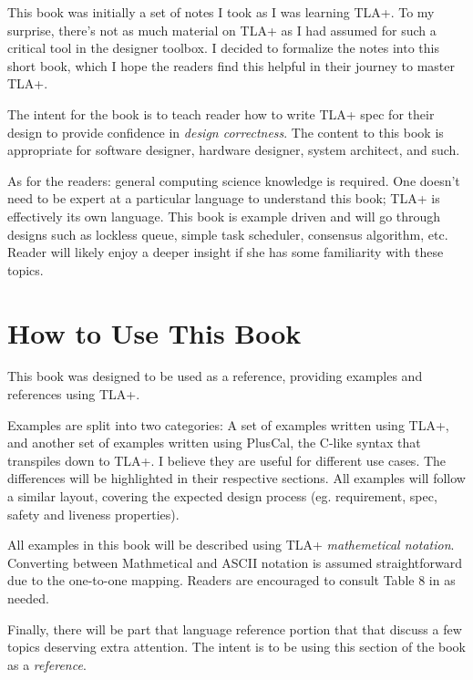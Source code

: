 This book was initially a set of notes I took as I was learning TLA+. To my
surprise, there's not as much material on TLA+ as I had assumed for such a
critical tool in the designer toolbox. I decided to formalize the notes into
this short book, which I hope the readers find this helpful in their journey to
master TLA+.  \newline

The intent for the book is to teach reader how to write TLA+ spec for their
design to provide confidence in \textit{design correctness}. The content to this
book is appropriate for software designer, hardware designer, system architect,
and such.\newline 

As for the readers: general computing science knowledge is required. One doesn't
need to be expert at a particular language to understand this book; TLA+ is
effectively its own language. This book is example driven and will go through
designs such as lockless queue, simple task scheduler, consensus algorithm, etc.
Reader will likely enjoy a deeper insight if she has some familiarity with these
topics.

\section{How to Use This Book}

This book was designed to be used as a reference, providing examples and
references using TLA+.\newline

Examples are split into two categories: A set of examples written using TLA+,
and another set of examples written using PlusCal, the C-like syntax that
transpiles down to TLA+. I believe they are useful for different use cases.  The
differences will be highlighted in their respective sections. All examples will
follow a similar layout, covering the expected design process (eg. requirement,
spec, safety and liveness properties).\newline

All examples in this book will be described using TLA+ \textit{mathemetical
notation}. Converting between Mathmetical and ASCII notation is assumed
straightforward due to the one-to-one mapping. Readers are encouraged to consult
Table 8 in \cite{ss} as needed.\newline

Finally, there will be part that language reference portion that that discuss a
few topics deserving extra attention. The intent is to be using this section of the 
book as a \textit{reference}.

